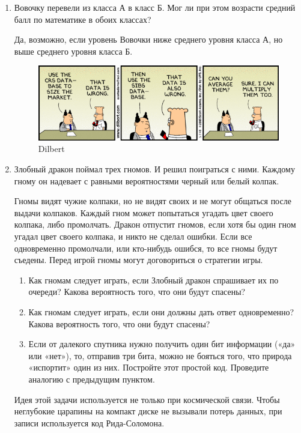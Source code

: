 \documentclass[nobib]{tufte-handout}
\begin{document}
\begin{enumerate}
\item Вовочку перевели из класса А в класс Б. Мог ли при этом возрасти средний балл по математике в обоих классах?

\begin{solution}
Да, возможно, если уровень Вовочки ниже среднего уровня класса А, но выше среднего уровня класса Б.
\end{solution}

\begin{figure}
  \includegraphics[width=17cm]{average.png}
  \caption{Dilbert}
\end{figure}



\item Злобный дракон поймал трех гномов. И решил поиграться с ними. Каждому гному он надевает с равными вероятностями черный или белый колпак. 


Гномы видят чужие колпаки, но не видят своих и не могут общаться после выдачи колпаков. Каждый гном может попытаться угадать цвет своего колпака, либо промолчать. Дракон отпустит гномов, если хотя бы один гном угадал цвет своего колпака, и никто не сделал ошибки. Если все одновременно промолчали, или кто-нибудь ошибся, то все гномы будут съедены. Перед игрой гномы могут договориться о стратегии игры.
\begin{enumerate}
\item Как гномам следует играть, если Злобный дракон спрашивает их по очереди? Какова вероятность того, что они будут спасены?
\item Как гномам следует играть, если они должны дать ответ одновременно? Какова вероятность того, что они будут спасены?
\item Если от далекого спутника нужно получить один бит информации («да» или «нет»), то, отправив три бита, можно не бояться того, что природа «испортит» один из них. Постройте этот простой код. Проведите аналогию с предыдущим пунктом. 
\end{enumerate}
Идея этой задачи используется не только при космической связи. Чтобы неглубокие царапины на компакт диске не вызывали потерь данных, при записи используется код Рида-Соломона.


\end{enumerate}
\end{document}
